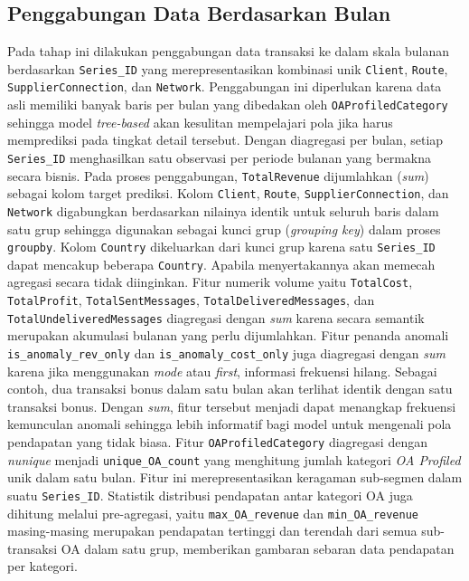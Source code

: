 \subsection{Penggabungan Data Berdasarkan Bulan}
Pada tahap ini dilakukan penggabungan data transaksi ke dalam skala bulanan berdasarkan \texttt{Series\_ID} yang merepresentasikan kombinasi unik \texttt{Client}, \texttt{Route}, \texttt{SupplierConnection}, dan \texttt{Network}. Penggabungan ini diperlukan karena data asli memiliki banyak baris per bulan yang dibedakan oleh \texttt{OAProfiledCategory} sehingga model \textit{tree-based} akan kesulitan mempelajari pola jika harus memprediksi pada tingkat detail tersebut. Dengan diagregasi per bulan, setiap \texttt{Series\_ID} menghasilkan satu observasi per periode bulanan yang bermakna secara bisnis.
Pada proses penggabungan, \texttt{TotalRevenue} dijumlahkan (\textit{sum}) sebagai kolom target prediksi. Kolom \texttt{Client}, \texttt{Route}, \texttt{SupplierConnection}, dan \texttt{Network} digabungkan berdasarkan nilainya identik untuk seluruh baris dalam satu grup sehingga digunakan sebagai kunci grup (\textit{grouping key}) dalam proses \texttt{groupby}. Kolom \texttt{Country} dikeluarkan dari kunci grup karena satu \texttt{Series\_ID} dapat mencakup beberapa \texttt{Country}. Apabila menyertakannya akan memecah agregasi secara tidak diinginkan. Fitur numerik volume yaitu \texttt{TotalCost}, \texttt{TotalProfit}, \texttt{TotalSentMessages}, \texttt{TotalDeliveredMessages}, dan \texttt{TotalUndeliveredMessages} diagregasi dengan \textit{sum} karena secara semantik merupakan akumulasi bulanan yang perlu dijumlahkan. Fitur penanda anomali \texttt{is\_anomaly\_rev\_only} dan \texttt{is\_anomaly\_cost\_only} juga diagregasi dengan \textit{sum} karena jika menggunakan \textit{mode} atau \textit{first}, informasi frekuensi hilang. Sebagai contoh, dua transaksi bonus dalam satu bulan akan terlihat identik dengan satu transaksi bonus. Dengan \textit{sum}, fitur tersebut menjadi dapat menangkap frekuensi kemunculan anomali sehingga lebih informatif bagi model untuk mengenali pola pendapatan yang tidak biasa.
Fitur \texttt{OAProfiledCategory} diagregasi dengan \textit{nunique} menjadi \texttt{unique\_OA\_count} yang menghitung jumlah kategori \textit{OA Profiled} unik dalam satu bulan. Fitur ini merepresentasikan keragaman sub-segmen dalam suatu \texttt{Series\_ID}. Statistik distribusi pendapatan antar kategori OA juga dihitung melalui pre-agregasi, yaitu \texttt{max\_OA\_revenue} dan \texttt{min\_OA\_revenue} masing-masing merupakan pendapatan tertinggi dan terendah dari semua sub-transaksi OA dalam satu grup, memberikan gambaran sebaran data pendapatan per kategori.
